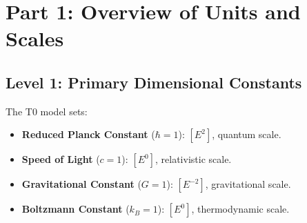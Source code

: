 ﻿\documentclass[12pt,a4paper]{article}
\begin{document}
	\section{Part 1: Overview of Units and Scales}
	\label{sec:hierarchy}
	
	\subsection{Level 1: Primary Dimensional Constants}
	\label{subsec:level1}
	
	The T0 model sets:
	\begin{itemize}
		\item \textbf{Reduced Planck Constant} (\(\hbar = 1\)): \([E^2]\), quantum scale.
		\item \textbf{Speed of Light} (\(c = 1\)): \([E^0]\), relativistic scale.
		\item \textbf{Gravitational Constant} (\(G = 1\)): \([E^{-2}]\), gravitational scale.
		\item \textbf{Boltzmann Constant} (\(k_B = 1\)): \([E^0]\), thermodynamic scale.
	\end{itemize}
	
\end{document}
